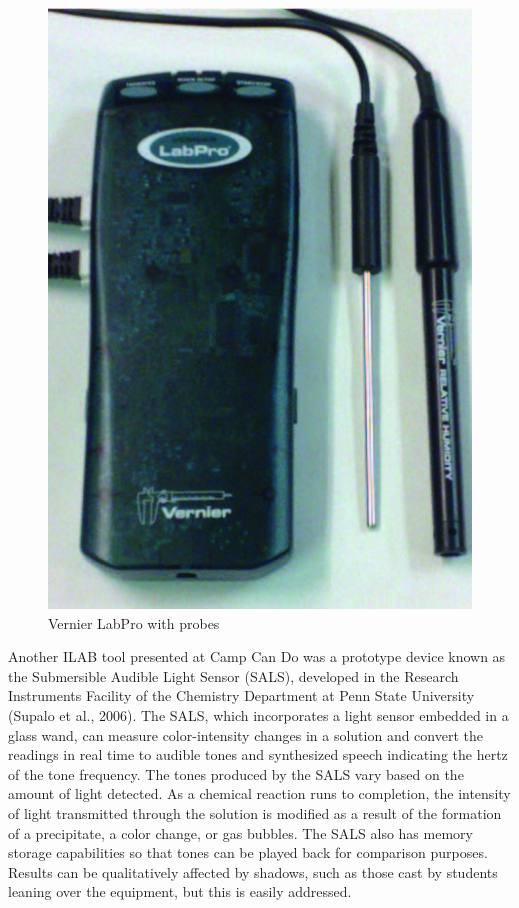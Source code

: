 \documentclass[11.5pt]{sig-alternate} %
\begin{document}
\begin{large}
\begin{figure}[htp]
    \centering
    \includegraphics[width=\columnwidth]{Figure 1.jpg}
    \caption{Vernier LabPro with probes}
    \label{Figure 1}
\end{figure}

Another ILAB tool presented at Camp Can Do was a prototype device known as the Submersible Audible Light Sensor (SALS), developed in the Research Instruments Facility of the Chemistry Department at Penn State University (Supalo et al., 2006). The SALS, which incorporates a light sensor embedded in a glass wand, can measure color-intensity changes in a solution and convert the readings in real time to audible tones and synthesized speech indicating the hertz of the tone frequency. The tones produced by the SALS vary based on the amount of light detected. As a chemical reaction runs to completion, the intensity of light transmitted through the solution is modified as a result of the formation of a precipitate, a color change, or gas bubbles. The SALS also has memory storage capabilities so that tones can be played back for comparison purposes. Results can be qualitatively affected by shadows, such as those cast by students leaning over the equipment, but this is easily addressed.


\end{large}
\end{document}
